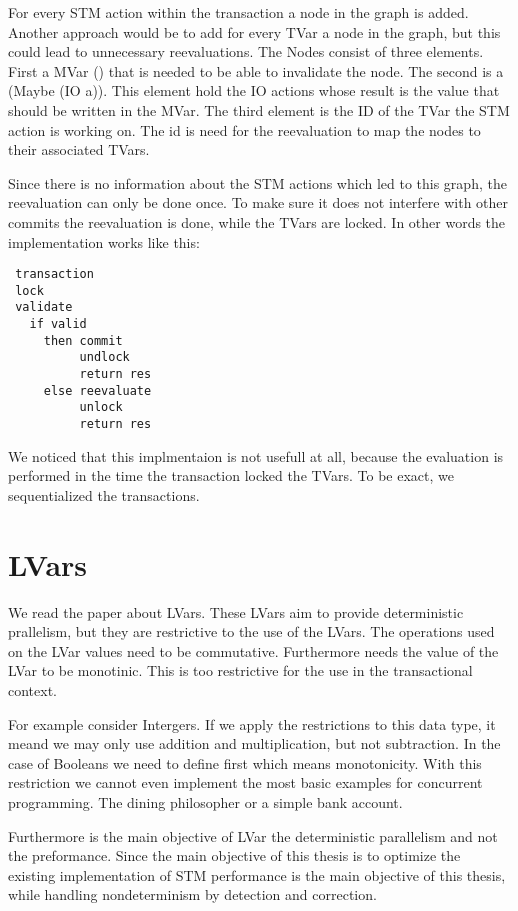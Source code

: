 \documentclass[a4paper,10pt]{article}
\begin{document}
For every STM action within the transaction a node in the graph is added. Another approach would be to add for every
TVar a node in the graph, but this could lead to unnecessary reevaluations.
The Nodes consist of three elements. First a MVar () that is needed to be able to invalidate the node. The second is 
a (Maybe (IO a)). This element hold the IO actions whose result is the value that should be written in the MVar.
The third element is the ID of the TVar the STM action is working on. The id is need for the reevaluation to 
map the nodes to their associated TVars.

Since there is no information about the STM actions which led to this graph, the reevaluation can only be done once.
To make sure it does not interfere with other commits the reevaluation is done, while the TVars are locked. 
In other words the implementation works like this:
\begin{lstlisting}
 transaction
 lock
 validate
   if valid
     then commit
          undlock 
          return res
     else reevaluate
          unlock 
          return res
\end{lstlisting}
We noticed that this implmentaion is not usefull at all, because the evaluation is performed in the time the transaction locked the 
TVars. To be exact, we sequentialized the transactions.

\section{LVars}
We read the paper about LVars\cite{kuper2013lvars}. These LVars aim to provide deterministic prallelism, but they are restrictive to the use
of the LVars. The operations used on the LVar values need to be commutative. Furthermore needs the value of the LVar to be monotinic. This 
is too restrictive for the use in the transactional context.

For example consider Intergers. If we apply the restrictions to this data type, it meand we may only use addition and multiplication, but not
subtraction. In the case of Booleans we need to define first which means monotonicity. With this restriction we cannot even implement the most 
basic examples for concurrent programming. The dining philosopher or a simple bank account. 

Furthermore is the main objective of LVar the deterministic parallelism and not the preformance. Since the main objective of this thesis is 
to optimize the existing implementation of STM performance is the main objective of this thesis, while handling nondeterminism by detection
and correction.





\end{document}
